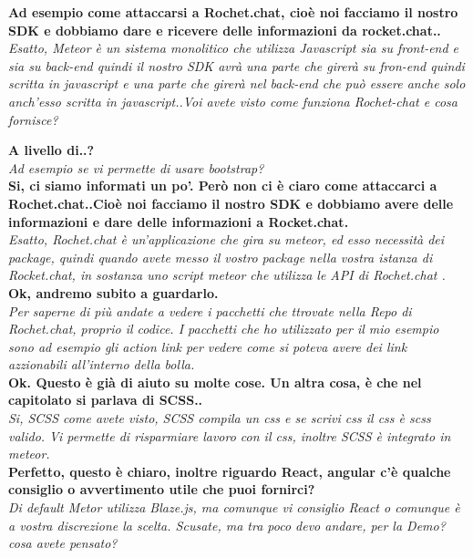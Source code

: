 \documentclass[10 pt,a4paper, openany]{article}
\begin{document}
\textbf{Ad esempio come attaccarsi a Rochet.chat, cioè noi facciamo il nostro SDK e dobbiamo dare e ricevere delle informazioni da rocket.chat..}\\
\textit{Esatto, Meteor è un sistema monolitico che utilizza Javascript sia su front-end e sia su back-end quindi il nostro SDK avrà una parte che girerà su fron-end quindi scritta in javascript e una parte che girerà nel back-end che può essere anche solo anch'esso scritta in javascript..Voi avete visto come funziona Rochet-chat e cosa fornisce?}

\textbf{A livello di..?}\\
\textit{Ad esempio se vi permette di usare bootstrap?}\\

\textbf{Si, ci siamo informati un po'. Però non ci è ciaro come attaccarci a Rochet.chat..Cioè noi facciamo il nostro SDK e dobbiamo avere delle informazioni e dare delle informazioni a Rocket.chat.}\\
\textit{Esatto, Rochet.chat è un'applicazione che gira su meteor, ed esso necessità dei package, quindi quando avete messo il vostro package nella vostra istanza di Rocket.chat, in sostanza uno script meteor che utilizza le API di Rochet.chat .
}\\

\textbf{Ok, andremo subito a guardarlo.}\\
\textit{ Per saperne di più andate a vedere i pacchetti che ttrovate nella Repo di Rochet.chat, proprio il codice. I pacchetti che ho utilizzato per il mio esempio sono ad esempio gli action link per vedere come si poteva avere dei link azzionabili all'interno della bolla.}\\

\textbf{Ok. Questo è già di aiuto su molte cose. Un altra cosa, è che nel capitolato si parlava di SCSS..}\\
\textit{Si, SCSS come avete visto, SCSS compila un css e se scrivi css il css è scss valido.
Vi permette di risparmiare lavoro con il css, inoltre SCSS è integrato in meteor.}\\

\textbf{Perfetto, questo è chiaro, inoltre riguardo React, angular c'è qualche consiglio o avvertimento utile che puoi fornirci?}\\
\textit{Di default Metor utilizza Blaze.js, ma comunque vi consiglio React o comunque è a vostra discrezione la scelta. Scusate, ma tra poco devo andare, per la Demo? cosa avete pensato?}\\
\end{document}
